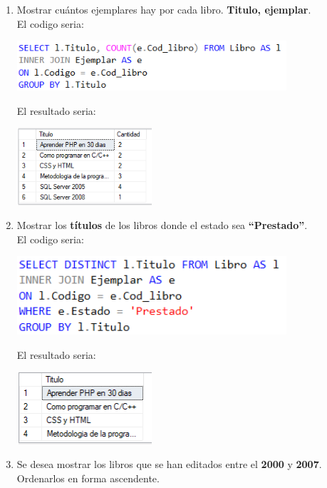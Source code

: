 \documentclass[12pt,letterpaper]{article}
\newcommand\tab[1][1cm]{\hspace*{#1}}
\begin{document}
\begin{enumerate}[\tab 1.]
\begin{center}
        \end{center}
        \item Mostrar cuántos ejemplares hay por cada libro. \textbf{Titulo, ejemplar}.\\[0.1in]
        El codigo seria:
        \begin{center}
            \includegraphics[width=10cm]{./img/img9.1.png}
        \end{center}
        El resultado seria:
        \begin{center}
            \includegraphics[width=5cm]{./img/img9.2.png}
        \end{center}
        \item Mostrar los \textbf{títulos} de los libros donde el estado sea \textbf{“Prestado”}.\\[0.1in]
        El codigo seria:
        \begin{center}
            \includegraphics[width=10cm]{./img/img10.1.png}
        \end{center}
        El resultado seria:
        \begin{center}
            \includegraphics[width=5cm]{./img/img10.2.png}
        \end{center}
        \item Se desea mostrar los libros que se han editados entre el \textbf{2000} y \textbf{2007}. Ordenarlos en forma ascendente.\\[0.1in]

\end{enumerate}
\end{document}
